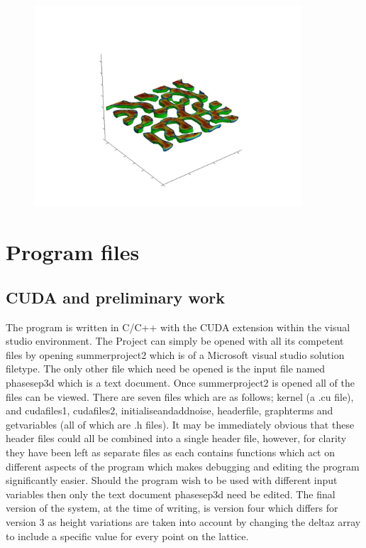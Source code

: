 \documentclass{article}
\numberwithin{equation}{section} %
\begin{document}
\begin{figure}[h]
\begin{center}
\includegraphics[width=10cm]{diffusion_5.jpg}
\label{info2}
\end{center}
\end{figure}

\newpage
\setcounter{page}{1}

\section{Program files}
\subsection{CUDA and preliminary work}
The program is written in C/C++ with the CUDA extension within the visual studio environment. The Project can simply be opened with all its competent files by opening summer\textunderscore project2 which is of a Microsoft visual studio solution filetype. The only other file which need be opened is the input file named phasesep3d which is a text document. Once summer\textunderscore project2 is opened all of the files can be viewed. There are seven files which are as follows; kernel (a .cu file), and  cudafiles1, cudafiles2, initialise\textunderscore and\textunderscore addnoise, headerfile, graphterms and getvariables (all of which are .h files). It may be immediately obvious that these header files could all be combined into a single header file, however, for clarity they have been left as separate files as each contains functions which act on different aspects of the program which makes debugging and editing the program significantly easier. Should the program wish to be used with different input variables then only the text document phasesep3d need be edited. The final version of the system, at the time of writing, is version four which differs for version 3 as height variations are taken into account by changing the delta\textunderscore z array to include a specific value for every point on the lattice.
\end{document}
